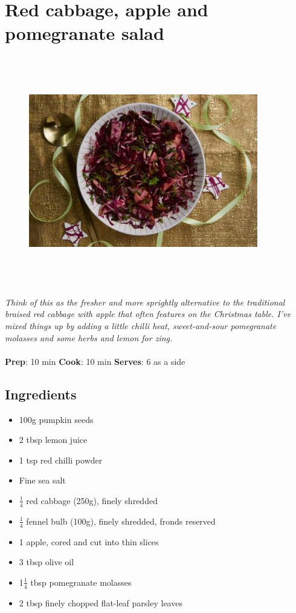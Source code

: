 \documentclass{book}
\begin{document}
\section{Red cabbage, apple and pomegranate salad}
\begin{figure}
\centering\includegraphics[width=10cm,height=10cm,keepaspectratio]{Recipe_Pictures/Red_cabbage,_apple_and_pomegranate_salad.png}
\end{figure}
\emph{Think of this as the fresher and more sprightly alternative to the traditional braised red cabbage with apple that often features on the Christmas table. I’ve mixed things up by adding a little chilli heat, sweet-and-sour pomegranate molasses and some herbs and lemon for zing.}\\\\ 
\textbf{Prep}: 10 min
\textbf{Cook}: 10 min
\textbf{Serves}: 6 as a side
\subsection*{Ingredients}
\begin{itemize}
\item 100g pumpkin seeds 
\item 2 tbsp lemon juice 
\item 1 tsp red chilli powder 
\item Fine sea salt 
\item $\frac{1}{4}$ red cabbage (250g), finely shredded 
\item $\frac{1}{4}$ fennel bulb (100g), finely shredded, fronds reserved
\item 1 apple, cored and cut into thin slices 
\item 3 tbsp olive oil 
\item 1$\frac{1}{4}$ tbsp pomegranate molasses 
\item 2 tbsp finely chopped flat-leaf parsley leaves
\end{itemize}
\end{document}

